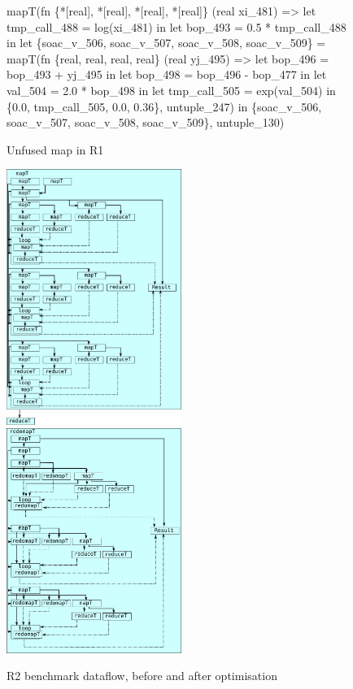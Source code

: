 \begin{figure}
\begin{center}
\begin{bcolorcode}
mapT(fn \{*[real], *[real], *[real], *[real]\} (real xi_481) =>
       let tmp_call_488 = log(xi_481) in
       let bop_493 = 0.5 * tmp_call_488 in
       let \{soac_v_506, soac_v_507, soac_v_508, soac_v_509\} =
         mapT(fn \{real, real, real, real\} (real yj_495) =>
                let bop_496 = bop_493 + yj_495 in
                let bop_498 = bop_496 - bop_477 in
                let val_504 = 2.0 * bop_498 in
                let tmp_call_505 = exp(val_504) in
                \{0.0, tmp_call_505, 0.0, 0.36\},
              untuple_247) in
       \{soac_v_506, soac_v_507, soac_v_508, soac_v_509\},
     untuple_130)
\end{bcolorcode}
\end{center}
\caption{Unfused map in R1}
\label{fig:r1-unfused-map}
\end{figure}

\begin{figure}
\begin{center}
\includegraphics[width=5.7cm,valign=t]{img/CalibLexiFi-unfused.pdf}
\hspace{0.2cm}
\includegraphics[width=5.7cm,valign=t]{img/CalibLexiFi-fused.pdf}
\end{center}
\caption{R2 benchmark dataflow, before and after optimisation}
\label{fig:r2-dataflow}
\end{figure}

